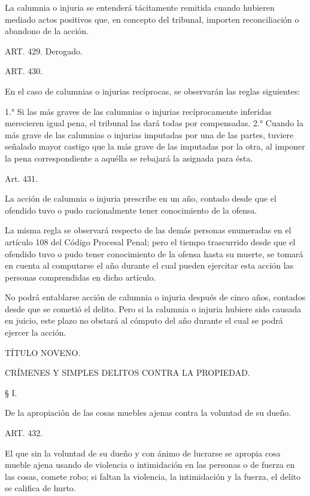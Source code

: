     La calumnia o injuria se entenderá tácitamente remitida cuando hubieren mediado actos positivos que, en concepto del tribunal, importen reconciliación o abandono de la acción.

    ART. 429. Derogado.

    ART. 430.

    En el caso de calumnias o injurias recíprocas, se observarán las reglas siguientes:

    1.° Si las más graves de las calumnias o injurias recíprocamente inferidas merecieren igual pena, el tribunal las dará todas por compensadas.
    2.° Cuando la más grave de las calumnias o injurias imputadas por una de las partes, tuviere señalado mayor castigo que la más grave de las imputadas por la otra, al imponer la pena correspondiente a aquélla se rebajará la asignada para ésta.




    Art. 431.

    La acción de calumnia o injuria prescribe en un año, contado desde que el ofendido tuvo o pudo racionalmente tener conocimiento de la ofensa.

    La misma regla se observará respecto de las demás personas enumeradas en el artículo 108 del Código Procesal Penal; pero el tiempo trascurrido desde que el ofendido tuvo o pudo tener conocimiento de la ofensa hasta su muerte, se tomará en cuenta al computarse el año durante el cual pueden ejercitar esta acción las personas comprendidas en dicho artículo.

    No podrá entablarse acción de calumnia o injuria después de cinco años, contados desde que se cometió el delito. Pero si la calumnia o injuria hubiere sido causada en juicio, este plazo no obstará al cómputo del año durante el cual se podrá ejercer la acción.


    TÍTULO NOVENO.

    CRÍMENES Y SIMPLES DELITOS CONTRA LA PROPIEDAD.








    § I.

    De la apropiación de las cosas muebles ajenas contra la voluntad de su dueño.





    ART. 432.

    El que sin la voluntad de su dueño y con ánimo de lucrarse se apropia cosa mueble ajena usando de violencia o intimidación en las personas o de fuerza en las cosas, comete robo; si faltan la violencia, la intimidación y la fuerza, el delito se califica de hurto.
   



